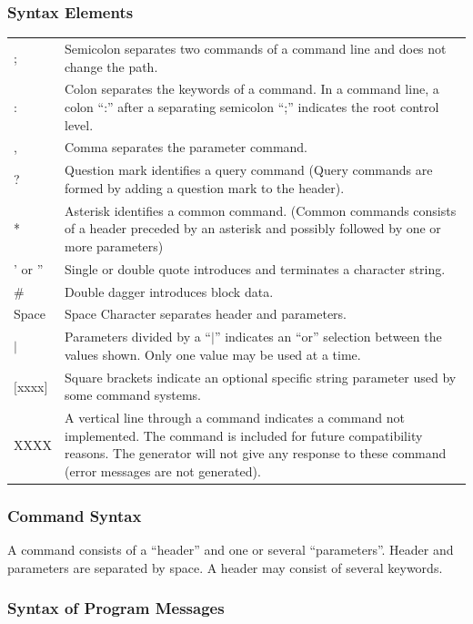 \subsubsection{Syntax Elements}

\begin{tabular*}{\textwidth}{@{\extracolsep{\fill}}|l|p{28em}|}
; 		& Semicolon separates two commands of a command line and does not change the path.\\
: 		& Colon separates the keywords of a command. In a command line, a colon ``:'' after a separating semicolon ``;'' indicates the root control level.\\
, 		& Comma separates the parameter command.\\
? 		& Question mark identifies a query command (Query commands are formed by adding a question mark to the header).\\
* 		& Asterisk identifies a common command. (Common commands consists of a header preceded by an asterisk and possibly followed by one or more parameters)\\
' or '' & Single or double quote introduces and terminates a character string.\\
\# 		& Double dagger introduces block data. \\
Space & Space Character separates header and parameters.\\
$|$		& Parameters divided by a ``$|$'' indicates an ``or'' selection between the values shown. Only one value may be used at a time.\\
$[$xxxx$]$ & Square brackets indicate an optional specific string parameter used by some command systems.\\
XXXX 	& A vertical line through a command indicates a command not implemented. The command is included for future compatibility
reasons. The generator will not give any response to these command (error messages are not generated).\\
\end{tabular*}

\subsubsection{Command Syntax}

A command consists of a ``header'' and one or several ``parameters''. Header and parameters are separated by space. A header may consist of several keywords.

\subsubsection{Syntax of Program Messages}

